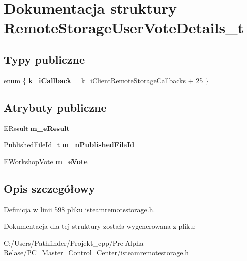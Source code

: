 \hypertarget{struct_remote_storage_user_vote_details__t}{}\section{Dokumentacja struktury Remote\+Storage\+User\+Vote\+Details\+\_\+t}
\label{struct_remote_storage_user_vote_details__t}
\subsection*{Typy publiczne}
\begin{DoxyCompactItemize}
\item 
\mbox{\label{struct_remote_storage_user_vote_details__t_a8aa406422cc10057da2b51ab27e0e4c4}} 
enum \{ {\bfseries k\+\_\+i\+Callback} = k\+\_\+i\+Client\+Remote\+Storage\+Callbacks + 25
 \}
\end{DoxyCompactItemize}
\subsection*{Atrybuty publiczne}
\begin{DoxyCompactItemize}
\item 
\mbox{\label{struct_remote_storage_user_vote_details__t_af0711f77ce73f60ec19d9860395a8cb9}} 
E\+Result {\bfseries m\+\_\+e\+Result}
\item 
\mbox{\label{struct_remote_storage_user_vote_details__t_a66e337a2b7ffc6696b68944af2b1d18b}} 
Published\+File\+Id\+\_\+t {\bfseries m\+\_\+n\+Published\+File\+Id}
\item 
\mbox{\label{struct_remote_storage_user_vote_details__t_a7be8e8c150b87ca38207685635b4eb80}} 
E\+Workshop\+Vote {\bfseries m\+\_\+e\+Vote}
\end{DoxyCompactItemize}


\subsection{Opis szczegółowy}


Definicja w linii 598 pliku isteamremotestorage.\+h.



Dokumentacja dla tej struktury została wygenerowana z pliku\+:\begin{DoxyCompactItemize}
\item 
C\+:/\+Users/\+Pathfinder/\+Projekt\+\_\+cpp/\+Pre-\/\+Alpha Relase/\+P\+C\+\_\+\+Master\+\_\+\+Control\+\_\+\+Center/isteamremotestorage.\+h\end{DoxyCompactItemize}
